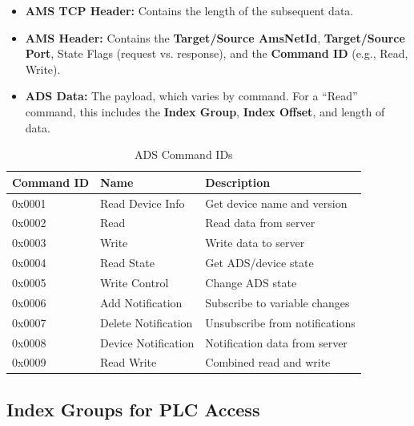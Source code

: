 \documentclass[11pt,a4paper]{article}
\begin{document}
\begin{itemize}[leftmargin=*]
    \item \textbf{AMS TCP Header:} Contains the length of the subsequent data.
    
    \item \textbf{AMS Header:} Contains the \textbf{Target/Source AmsNetId}, \textbf{Target/Source Port}, State Flags (request vs. response), and the \textbf{Command ID} (e.g., Read, Write).
    
    \item \textbf{ADS Data:} The payload, which varies by command. For a ``Read'' command, this includes the \textbf{Index Group}, \textbf{Index Offset}, and length of data.
\end{itemize}

\begin{table}[h]
\centering
\begin{tabular}{@{}lll@{}}
\toprule
\textbf{Command ID} & \textbf{Name} & \textbf{Description} \\
\midrule
0x0001 & Read Device Info & Get device name and version \\
0x0002 & Read & Read data from server \\
0x0003 & Write & Write data to server \\
0x0004 & Read State & Get ADS/device state \\
0x0005 & Write Control & Change ADS state \\
0x0006 & Add Notification & Subscribe to variable changes \\
0x0007 & Delete Notification & Unsubscribe from notifications \\
0x0008 & Device Notification & Notification data from server \\
0x0009 & Read Write & Combined read and write \\
\bottomrule
\end{tabular}
\caption{ADS Command IDs}
\end{table}

\subsection{Index Groups for PLC Access}
\end{document}
